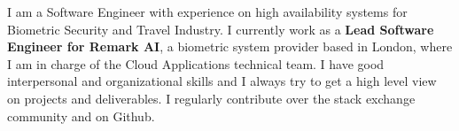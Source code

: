 

\begin{cvparagraph}

I am a Software Engineer with experience on high availability systems for Biometric Security and Travel Industry.
I currently work as a \textbf{Lead Software Engineer for Remark AI}, a biometric system provider based in London, where I am
in charge of the Cloud Applications technical team.
I have good interpersonal and organizational skills and I always try to get a high level view on projects and deliverables.
I regularly contribute over the stack exchange community and on Github.
\end{cvparagraph}
